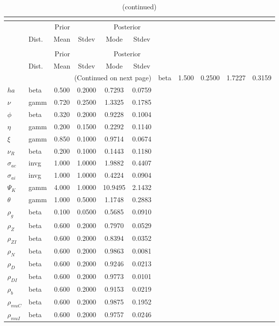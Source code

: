  
\begin{center}
\begin{longtable}{llcccc} 
\caption{Results from posterior maximization (parameters)}\\
 \label{Table:Posterior:1}\\
\toprule 
  & \multicolumn{3}{c}{Prior}  &  \multicolumn{2}{c}{Posterior} \\
  \cmidrule(r{.75em}){2-4} \cmidrule(r{.75em}){5-6}
  & Dist. & Mean  & Stdev & Mode & Stdev \\ 
\midrule \endfirsthead 
\caption{(continued)}\\
 \bottomrule 
  & \multicolumn{3}{c}{Prior}  &  \multicolumn{2}{c}{Posterior} \\
  \cmidrule(r{.75em}){2-4} \cmidrule(r{.75em}){5-6}
  & Dist. & Mean  & Stdev & Mode & Stdev \\ 
\midrule \endhead 
\bottomrule \multicolumn{6}{r}{(Continued on next page)}\endfoot 
\bottomrule\endlastfoot 
${\sigma}$ & beta &   1.500 & 0.2500 &   1.7227 &  0.3159 \\ 
${ha}$ & beta &   0.500 & 0.2000 &   0.7293 &  0.0759 \\ 
$\nu$ & gamm &   0.720 & 0.2500 &   1.3325 &  0.1785 \\ 
${\phi}$ & beta &   0.320 & 0.2000 &   0.9228 &  0.1004 \\ 
${\eta}$ & gamm &   0.200 & 0.1500 &   0.2292 &  0.1140 \\ 
$\xi$ & gamm &   0.850 & 0.1000 &   0.9714 &  0.0674 \\ 
${\nu_R}$ & beta &   0.200 & 0.1000 &   0.1443 &  0.1180 \\ 
${\sigma_{ac}}$ & invg &   1.000 & 1.0000 &   1.9882 &  0.4407 \\ 
${\sigma_{ai}}$ & invg &   1.000 & 1.0000 &   0.4224 &  0.0904 \\ 
${\Psi_{K}}$ & gamm &   4.000 & 1.0000 &  10.9495 &  2.1432 \\ 
${\theta}$ & gamm &   1.000 & 0.5000 &   1.1748 &  0.2883 \\ 
${\rho_g}$ & beta &   0.100 & 0.0500 &   0.5685 &  0.0910 \\ 
${\rho_Z}$ & beta &   0.600 & 0.2000 &   0.7970 &  0.0529 \\ 
${\rho_{ZI}}$ & beta &   0.600 & 0.2000 &   0.8394 &  0.0352 \\ 
${\rho_N}$ & beta &   0.600 & 0.2000 &   0.9863 &  0.0081 \\ 
${\rho_D}$ & beta &   0.600 & 0.2000 &   0.9246 &  0.0213 \\ 
${\rho_{DI}}$ & beta &   0.600 & 0.2000 &   0.9773 &  0.0101 \\ 
${\rho_b}$ & beta &   0.600 & 0.2000 &   0.9153 &  0.0219 \\ 
${\rho_{muC}}$ & beta &   0.600 & 0.2000 &   0.9875 &  0.1952 \\ 
${\rho_{muI}}$ & beta &   0.600 & 0.2000 &   0.9757 &  0.0246 \\ 
\end{longtable}
 \end{center}
